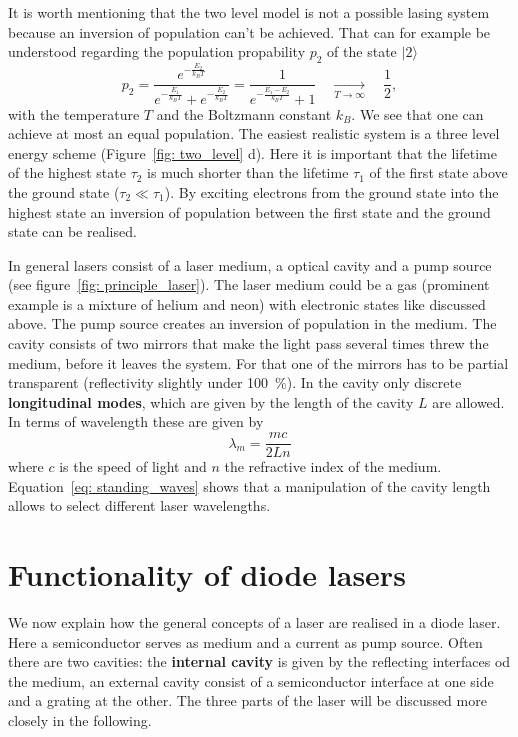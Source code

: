 It is worth mentioning that the two level model is not a possible lasing system because an inversion of population
can't be achieved. That can for example be understood
regarding the population propability $p_2$ of the state $|2\rangle$
\begin{equation}
  p_2 = \frac{e^{-\frac{E_2}{k_B T}}}{ e^{-\frac{E_1}{k_B T}} + e^{-\frac{E_2}{k_B T}} } =
  \frac{1}{ e^{-\frac{E_1 - E_2}{k_B T}} + 1}
    \quad \underset{T \rightarrow \infty}{\longrightarrow}\quad  \frac{1}{2},
\end{equation}
with the temperature $T$ and the Boltzmann constant $k_B$. We see that one can achieve at most an equal population. The easiest
realistic system is a three level energy scheme (Figure~\ref{fig: two_level} d). Here it is important that the lifetime of the highest state $\tau_2$ is much shorter
than the lifetime $\tau_1$ of the first state above the ground state ($\tau_2 \ll \tau_1$). By exciting electrons from the ground state into the highest
state an inversion of population between the first state and the ground state can be realised.

In general lasers consist of a laser medium, a optical cavity and a pump source (see figure~\ref{fig: principle_laser}).
The laser medium could be a gas (prominent example is a mixture of helium and neon) with electronic states like discussed above. The pump source
creates an inversion of population in the medium. The cavity consists of two mirrors that make the light pass several times threw the medium, before
it leaves the system. For that one of the mirrors has to be partial transparent (reflectivity slightly under \SI{100}{\percent}). In the
cavity only discrete \textbf{longitudinal modes}, which are given by the length of the cavity $L$ are allowed. In terms of wavelength these are
given by
\begin{equation}
  \lambda_m = \frac{m c}{2 L n}
  \label{eq: standing_waves}
\end{equation}
where $c$ is the speed of light and $n$ the refractive index of the medium. Equation~\eqref{eq: standing_waves} shows that a manipulation of the
cavity length allows to select different laser wavelengths.

\section{Functionality of diode lasers}
We now explain how the general concepts of a laser are realised in a diode laser. Here a semiconductor serves as medium and a current as pump source.
Often there are two cavities: the \textbf{internal cavity} is given by the reflecting interfaces od the medium, an external cavity consist of
a semiconductor interface at one side and a grating at the other. The three parts of the laser will be discussed more closely in the following.


